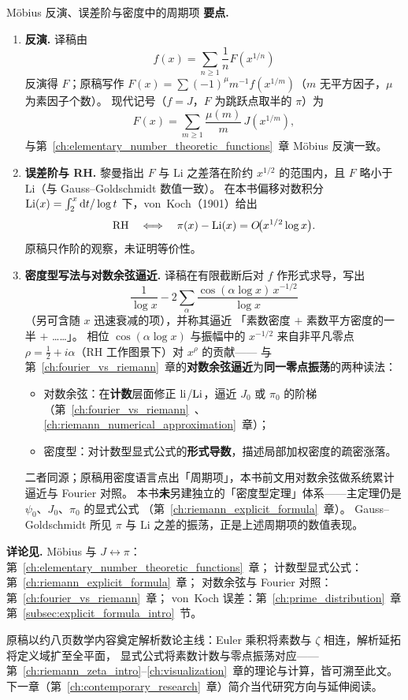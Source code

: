 \begin{commentary}{Möbius 反演、误差阶与密度中的周期项}
\textbf{要点.}
\begin{enumerate}
  \item \textbf{反演.}
    译稿由
    \[
    f(x)=\sum_{n\ge 1}\frac{1}{n}F\!\left(x^{1/n}\right)
    \]
    反演得 $F$；原稿写作
    $F(x)=\sum (-1)^\mu m^{-1}f(x^{1/m})$（$m$ 无平方因子，$\mu$ 为素因子个数）。
    现代记号（$f=J$，$F$ 为跳跃点取半的 $\pi$）为
    \[
    F(x)=\sum_{m\ge 1}\frac{\mu(m)}{m}\,J\!\left(x^{1/m}\right),
    \]
    与第~\ref{ch:elementary_number_theoretic_functions}~章 Möbius 反演一致。

  \item \textbf{误差阶与 RH.}
    黎曼指出 $F$ 与 $\mathrm{Li}$ 之差落在阶约 $x^{1/2}$ 的范围内，且 $F$ 略小于 $\mathrm{Li}$（与 Gauss--Goldschmidt 数值一致）。
    在本书偏移对数积分 $\operatorname{Li}(x)=\int_2^x\mathrm{d}t/\log t$ 下，von~Koch（1901）给出
    \[
    \mathrm{RH}
    \quad\Longleftrightarrow\quad
    \pi(x)-\operatorname{Li}(x)=O\!\bigl(x^{1/2}\log x\bigr).
    \]
    原稿只作阶的观察，未证明等价性。

  \item \textbf{密度型写法与对数余弦逼近.}
    译稿在有限截断后对 $f$ 作形式求导，写出
    \[
    \frac{1}{\log x}
    -2\sum_{\alpha}
    \frac{\cos(\alpha\log x)\,x^{-1/2}}{\log x}
    \]
    （另可含随 $x$ 迅速衰减的项），并称其逼近
    「素数密度 $+$ 素数平方密度的一半 $+$ ……」。
    相位 $\cos(\alpha\log x)$ 与振幅中的 $x^{-1/2}$ 来自非平凡零点
    $\rho=\frac12+i\alpha$（RH 工作图景下）对 $x^{\rho}$ 的贡献——
    与第~\ref{ch:fourier_vs_riemann}~章的\textbf{对数余弦逼近}为\textbf{同一零点振荡}的两种读法：
    \begin{itemize}
      \item 对数余弦：在\textbf{计数}层面修正 $\operatorname{li}$/$\operatorname{Li}$，逼近 $J_0$ 或 $\pi_0$ 的阶梯
            （第~\ref{ch:fourier_vs_riemann}~、\ref{ch:riemann_numerical_approximation}~章）；
      \item 密度型：对计数型显式公式的\textbf{形式导数}，描述局部加权密度的疏密涨落。
    \end{itemize}
    二者同源；原稿用密度语言点出「周期项」，本书前文用对数余弦做系统累计逼近与 Fourier 对照。
    本书\textbf{未}另建独立的「密度型定理」体系——主定理仍是 $\psi_0$、$J_0$、$\pi_0$ 的显式公式
    （第~\ref{ch:riemann_explicit_formula}~章）。
    Gauss--Goldschmidt 所见 $\pi$ 与 $\mathrm{Li}$ 之差的振荡，正是上述周期项的数值表现。
\end{enumerate}

\textbf{详论见.}
Möbius 与 $J\leftrightarrow\pi$：第~\ref{ch:elementary_number_theoretic_functions}~章；
计数型显式公式：第~\ref{ch:riemann_explicit_formula}~章；
对数余弦与 Fourier 对照：第~\ref{ch:fourier_vs_riemann}~章；
von~Koch 误差：第~\ref{ch:prime_distribution}~章第~\ref{subsec:explicit_formula_intro}~节。
\end{commentary}



\vspace{1.5em}
\noindent
原稿以约八页数学内容奠定解析数论主线：Euler 乘积将素数与 $\zeta$ 相连，解析延拓将定义域扩至全平面，
显式公式将素数计数与零点振荡对应——第~\ref{ch:riemann_zeta_intro}--\ref{ch:visualization}~章的理论与计算，皆可溯至此文。
下一章（第~\ref{ch:contemporary_research}~章）简介当代研究方向与延伸阅读。
